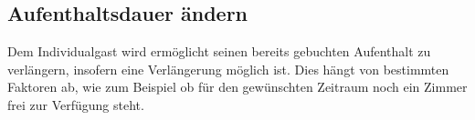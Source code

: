 \documentclass[../SubfileFeatures.tex]{subfiles}
\begin{document}
    \subsection{Aufenthaltsdauer ändern}
    Dem Individualgast wird ermöglicht seinen bereits gebuchten Aufenthalt zu verlängern,
    insofern eine Verlängerung möglich ist. Dies hängt von bestimmten Faktoren ab, wie zum Beispiel
    ob für den gewünschten Zeitraum noch ein Zimmer frei zur Verfügung steht.
\end{document}
